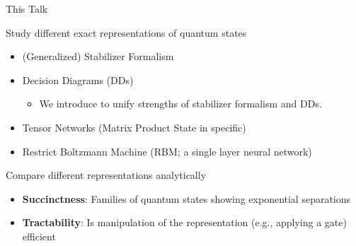 \begin{frame}{This Talk}
	

\begin{block}{Study different exact representations of quantum states}
	\begin{itemize}
		\item \alert{(Generalized) Stabilizer Formalism}
		\item \alert{Decision Diagrams (DDs)}
	\begin{itemize}
		\item We introduce \alert{\limdd} to unify strengths of stabilizer formalism and DDs.
	\end{itemize}
		\item Tensor Networks (Matrix Product State in specific)
		\item Restrict Boltzmann Machine (RBM; a single layer neural network)
	\end{itemize}
	\vspace{-.5em}
\end{block}

\pause
\vspace{-.5em}

\begin{block}{Compare different representations analytically}
\vspace{-.5em}
	\begin{itemize}
		\item \textbf{Succinctness}: Families of quantum states showing exponential separations
		\item \textbf{Tractability}: Is manipulation of the representation (e.g., applying a gate) efficient
	\end{itemize}
	\vspace{-.5em}
\end{block}

\pause


\begin{columns}
\begin{column}{.45\textwidth}	
\centering
~~~~~~~~
\end{column}
\end{columns}
\end{frame}
